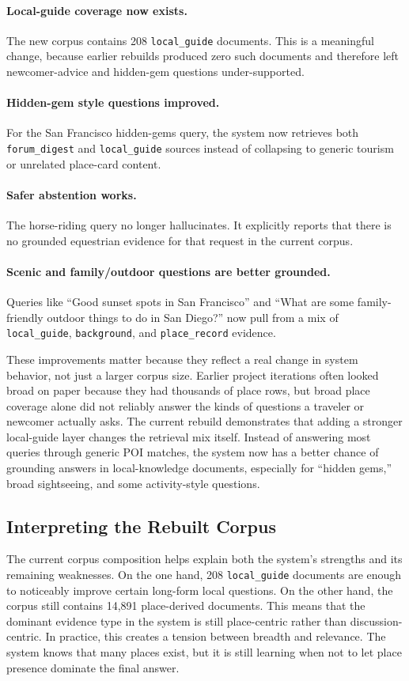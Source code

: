 \documentclass[11pt]{article}
\begin{document}
\paragraph{Local-guide coverage now exists.}
The new corpus contains 208 \texttt{local\_guide} documents. This is a meaningful change, because earlier rebuilds produced zero such documents and therefore left newcomer-advice and hidden-gem questions under-supported.

\paragraph{Hidden-gem style questions improved.}
For the San Francisco hidden-gems query, the system now retrieves both \texttt{forum\_digest} and \texttt{local\_guide} sources instead of collapsing to generic tourism or unrelated place-card content.

\paragraph{Safer abstention works.}
The horse-riding query no longer hallucinates. It explicitly reports that there is no grounded equestrian evidence for that request in the current corpus.

\paragraph{Scenic and family/outdoor questions are better grounded.}
Queries like ``Good sunset spots in San Francisco'' and ``What are some family-friendly outdoor things to do in San Diego?'' now pull from a mix of \texttt{local\_guide}, \texttt{background}, and \texttt{place\_record} evidence.

These improvements matter because they reflect a real change in system behavior, not just a larger corpus size. Earlier project iterations often looked broad on paper because they had thousands of place rows, but broad place coverage alone did not reliably answer the kinds of questions a traveler or newcomer actually asks. The current rebuild demonstrates that adding a stronger local-guide layer changes the retrieval mix itself. Instead of answering most queries through generic POI matches, the system now has a better chance of grounding answers in local-knowledge documents, especially for ``hidden gems,'' broad sightseeing, and some activity-style questions.

\subsection{Interpreting the Rebuilt Corpus}
The current corpus composition helps explain both the system's strengths and its remaining weaknesses. On the one hand, 208 \texttt{local\_guide} documents are enough to noticeably improve certain long-form local questions. On the other hand, the corpus still contains 14,891 place-derived documents. This means that the dominant evidence type in the system is still place-centric rather than discussion-centric. In practice, this creates a tension between breadth and relevance. The system knows that many places exist, but it is still learning when not to let place presence dominate the final answer.
\end{document}

